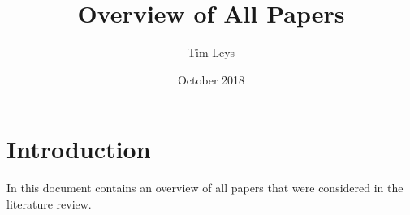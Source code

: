 \documentclass{article}
\title{Overview of All Papers}
\author{Tim Leys }
\date{October 2018}
\begin{document}
\maketitle

\section{Introduction}
In this document contains an overview of all papers that were considered in the literature review. 

\nocite{*}
{}

\end{document}
